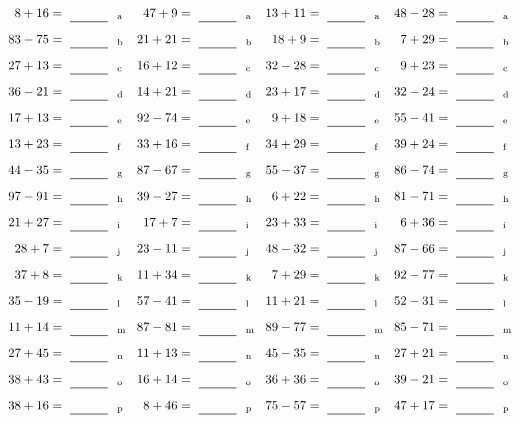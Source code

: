 \documentclass
[
  draft    = true,
  fontsize = 11pt,
  parskip  = half-
]
{scrartcl}
\begin{document}
\clearpage
\begin{align*}
    \pline{8+16}&=\rline{a}
  & \pline{47+9}&=\rline{a}
  & \pline{13+11}&=\rline{a}
  & \pline{48-28}&=\rline{a} \\[1ex]
    \pline{83-75}&=\rline{b}
  & \pline{21+21}&=\rline{b}
  & \pline{18+9}&=\rline{b}
  & \pline{7+29}&=\rline{b} \\[1ex]
    \pline{27+13}&=\rline{c}
  & \pline{16+12}&=\rline{c}
  & \pline{32-28}&=\rline{c}
  & \pline{9+23}&=\rline{c} \\[1ex]
    \pline{36-21}&=\rline{d}
  & \pline{14+21}&=\rline{d}
  & \pline{23+17}&=\rline{d}
  & \pline{32-24}&=\rline{d} \\[1ex]
    \pline{17+13}&=\rline{e}
  & \pline{92-74}&=\rline{e}
  & \pline{9+18}&=\rline{e}
  & \pline{55-41}&=\rline{e} \\[1ex]
    \pline{13+23}&=\rline{f}
  & \pline{33+16}&=\rline{f}
  & \pline{34+29}&=\rline{f}
  & \pline{39+24}&=\rline{f} \\[1ex]
    \pline{44-35}&=\rline{g}
  & \pline{87-67}&=\rline{g}
  & \pline{55-37}&=\rline{g}
  & \pline{86-74}&=\rline{g} \\[1ex]
    \pline{97-91}&=\rline{h}
  & \pline{39-27}&=\rline{h}
  & \pline{6+22}&=\rline{h}
  & \pline{81-71}&=\rline{h} \\[1ex]
    \pline{21+27}&=\rline{i}
  & \pline{17+7}&=\rline{i}
  & \pline{23+33}&=\rline{i}
  & \pline{6+36}&=\rline{i} \\[1ex]
    \pline{28+7}&=\rline{j}
  & \pline{23-11}&=\rline{j}
  & \pline{48-32}&=\rline{j}
  & \pline{87-66}&=\rline{j} \\[1ex]
    \pline{37+8}&=\rline{k}
  & \pline{11+34}&=\rline{k}
  & \pline{7+29}&=\rline{k}
  & \pline{92-77}&=\rline{k} \\[1ex]
    \pline{35-19}&=\rline{l}
  & \pline{57-41}&=\rline{l}
  & \pline{11+21}&=\rline{l}
  & \pline{52-31}&=\rline{l} \\[1ex]
    \pline{11+14}&=\rline{m}
  & \pline{87-81}&=\rline{m}
  & \pline{89-77}&=\rline{m}
  & \pline{85-71}&=\rline{m} \\[1ex]
    \pline{27+45}&=\rline{n}
  & \pline{11+13}&=\rline{n}
  & \pline{45-35}&=\rline{n}
  & \pline{27+21}&=\rline{n} \\[1ex]
    \pline{38+43}&=\rline{o}
  & \pline{16+14}&=\rline{o}
  & \pline{36+36}&=\rline{o}
  & \pline{39-21}&=\rline{o} \\[1ex]
    \pline{38+16}&=\rline{p}
  & \pline{8+46}&=\rline{p}
  & \pline{75-57}&=\rline{p}
  & \pline{47+17}&=\rline{p}
\end{align*}
\end{document}
